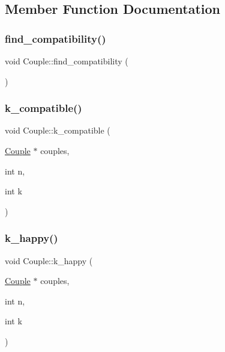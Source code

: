 \subsection{Member Function Documentation}
\mbox{\label{class_couple_afd44c116312fd411df285bde11e24b94}} 
\subsubsection{\texorpdfstring{find\+\_\+compatibility()}{find\_compatibility()}}
{\footnotesize\ttfamily void Couple\+::find\+\_\+compatibility (\begin{DoxyParamCaption}{ }\end{DoxyParamCaption})}

\mbox{\label{class_couple_ae93d0b2f169c7e21a3822bbf60fe0f14}} 
\subsubsection{\texorpdfstring{k\+\_\+compatible()}{k\_compatible()}}
{\footnotesize\ttfamily void Couple\+::k\+\_\+compatible (\begin{DoxyParamCaption}\item[{\hyperlink{class_couple}{Couple} $\ast$}]{couples,  }\item[{int}]{n,  }\item[{int}]{k }\end{DoxyParamCaption})\hspace{0.3cm}{\ttfamily [static]}}

\mbox{\label{class_couple_a60b6b151595d937d91d7cf9471996a9a}} 
\subsubsection{\texorpdfstring{k\+\_\+happy()}{k\_happy()}}
{\footnotesize\ttfamily void Couple\+::k\+\_\+happy (\begin{DoxyParamCaption}\item[{\hyperlink{class_couple}{Couple} $\ast$}]{couples,  }\item[{int}]{n,  }\item[{int}]{k }\end{DoxyParamCaption})\hspace{0.3cm}{\ttfamily [static]}}

